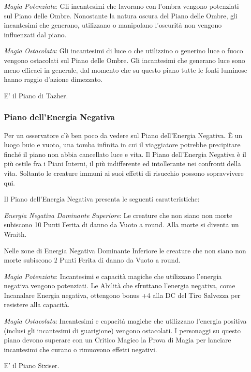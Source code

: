\documentclass[a4paper,twoside,openany]{book}
\begin{document}
\begin{multicols}{2}
\emph{Magia Potenziata}: Gli incantesimi che lavorano con l'ombra vengono potenziati sul Piano delle Ombre. Nonostante la natura oscura del Piano delle Ombre, gli incantesimi che generano, utilizzano o manipolano l'oscurità non vengono influenzati dal piano.

\emph{Magia Ostacolata}: Gli incantesimi di luce o che utilizzino o generino luce o fuoco vengono ostacolati sul Piano delle Ombre. Gli incantesimi che generano luce sono meno efficaci in generale, dal momento che su questo piano tutte le fonti luminose hanno raggio d'azione dimezzato.

E' il Piano di Tazher.

\subsubsection{Piano dell'Energia Negativa}\label{pianoenergianegativa}
Per un osservatore c'è ben poco da vedere sul Piano dell'Energia Negativa. È un luogo buio e vuoto, una tomba infinita in cui il viaggiatore potrebbe precipitare finché il piano non abbia cancellato luce e vita. Il Piano dell'Energia Negativa è il più ostile fra i Piani Interni, il più indifferente ed intollerante nei confronti della vita. Soltanto le creature immuni ai suoi effetti di risucchio possono sopravvivere qui.

Il Piano dell'Energia Negativa presenta le seguenti caratteristiche:

\emph{Energia Negativa Dominante Superiore}: Le creature che non siano non morte subiscono 10 Punti Ferita di danno da Vuoto a round. Alla morte si diventa un Wraith.

Nelle zone di Energia Negativa Dominante Inferiore le creature che non siano non morte subiscono 2 Punti Ferita di danno da Vuoto a round.

\emph{Magia Potenziata}: Incantesimi e capacità magiche che utilizzano l'energia negativa vengono potenziati. Le Abilità che sfruttano l'energia negativa, come Incanalare Energia negativa, ottengono bonus +4 alla DC del Tiro Salvezza per resistere alla capacità.

\emph{Magia Ostacolata}: Incantesimi e capacità magiche che utilizzano l'energia positiva (inclusi gli incantesimi di guarigione) vengono ostacolati. I personaggi su questo piano devono superare con un Critico Magico la Prova di Magia per lanciare incantesimi che curano o rimuovono effetti negativi.

E' il Piano Sixiser.


\end{multicols}
\end{document}
